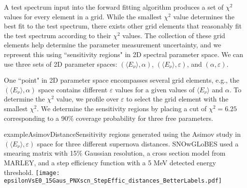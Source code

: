 

A test spectrum input into the forward fitting algorithm produces a set of $\chi^2$ values for every element in a grid. While the smallest $\chi^2$ value determines the best fit to the test spectrum, there exists other grid elements that reasonably fit the test spectrum according to their $\chi^2$ values. The collection of these grid elements help determine the parameter measurement uncertainty, and we represent this using ``sensitivity regions" in 2D spectral parameter space. We can use three sets of 2D parameter spaces: $(\langle E_\nu \rangle, \alpha)$, $(\langle E_\nu \rangle, \varepsilon)$, and $(\alpha, \varepsilon)$.

One ``point" in 2D parameter space encompasses several grid elements,
e.g., the $(\langle E_\nu \rangle, \alpha)$ space contains different
$\varepsilon$ values for a given values of $\langle E_\nu \rangle$ and
$\alpha$. To determine the $\chi^2$ value, we profile over
$\varepsilon$ to select the grid element with the smallest
$\chi^2$. We determine the sensitivity regions by placing a cut of
$\chi^2 = 6.25$ corresponding to a 90\% coverage probability for three
free parameters.

\begin{dunefigure}{exampleAsimovDistance}{Sensitivity regions generated using
    the Asimov study in $(\langle E_\nu \rangle, \varepsilon)$ space
    for three different supernova distances. SNOwGLoBES used a
    smearing matrix with 15\% Gaussian resolution, a cross section
    model from MARLEY, and a step efficiency function with a 5 MeV
    detected energy threshold.}
	\texttt{[image: epsilonVsE0\_15Gaus\_PNXscn\_StepEffic\_distances\_BetterLabels.pdf]}
  \end{dunefigure}


